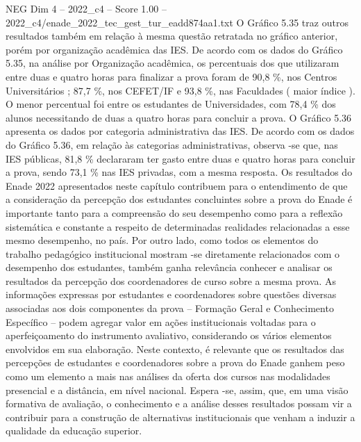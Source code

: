 \begin{textsample}{NEG Dim 4 – 2022\_c4 – Score 1.00 – 2022\_c4/enade\_2022\_tec\_gest\_tur\_eadd874aa1.txt}
O Gráfico 5.35 traz outros resultados também em relação à mesma questão retratada no gráfico anterior, porém por organização acadêmica das IES.
De acordo com os dados do Gráfico 5.35, na análise por Organização acadêmica, os percentuais dos que utilizaram entre duas e quatro horas para finalizar a prova foram de 90,8 \%, nos Centros Universitários ; 87,7 \%, nos CEFET/IF e 93,8 \%, nas Faculdades ( maior índice ).
O menor percentual foi entre os estudantes de Universidades, com 78,4 \% dos alunos necessitando de duas a quatro horas para concluir a prova.
O Gráfico 5.36 apresenta os dados por categoria administrativa das IES.
De acordo com os dados do Gráfico 5.36, em relação às categorias administrativas, observa -se que, nas IES públicas, 81,8 \% declararam ter gasto entre duas e quatro horas para concluir a prova, sendo 73,1 \% nas IES privadas, com a mesma resposta.
Os resultados do Enade 2022 apresentados neste capítulo contribuem para o entendimento de que a consideração da percepção dos estudantes concluintes sobre a prova do Enade é importante tanto para a compreensão do seu desempenho como para a reflexão sistemática e constante a respeito de determinadas realidades relacionadas a esse mesmo desempenho, no país.
Por outro lado, como todos os elementos do trabalho pedagógico institucional mostram -se diretamente relacionados com o desempenho dos estudantes, também ganha relevância conhecer e analisar os resultados da percepção dos coordenadores de curso sobre a mesma prova.
As informações expressas por estudantes e coordenadores sobre questões diversas associadas aos dois componentes da prova – Formação Geral e Conhecimento Específico – podem agregar valor em ações institucionais voltadas para o aperfeiçoamento do instrumento avaliativo, considerando os vários elementos envolvidos em sua elaboração.
Neste contexto, é relevante que os resultados das percepções de estudantes e coordenadores sobre a prova do Enade ganhem peso como um elemento a mais nas análises da oferta dos cursos nas modalidades presencial e a distância, em nível nacional.
Espera -se, assim, que, em uma visão formativa de avaliação, o conhecimento e a análise desses resultados possam vir a contribuir para a construção de alternativas institucionais que venham a induzir a qualidade da educação superior.

\end{textsample}
